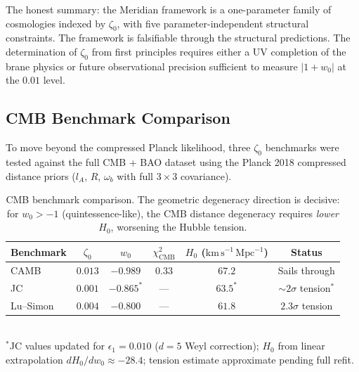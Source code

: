 The honest summary: the Meridian framework is a one-parameter family of cosmologies indexed by $\zeta_0$, with five parameter-independent structural constraints. The framework is falsifiable through the structural predictions. The determination of $\zeta_0$ from first principles requires either a UV completion of the brane physics or future observational precision sufficient to measure $|1+w_0|$ at the $0.01$ level.

\subsection{CMB Benchmark Comparison}
\label{sec:2-CMB-benchmarks}

To move beyond the compressed Planck likelihood, three $\zeta_0$ benchmarks were tested against the full CMB + BAO dataset using the Planck 2018 compressed distance priors ($l_A$, $R$, $\omega_b$ with full $3 \times 3$ covariance).

\begin{table}[htbp]
\centering
\caption{CMB benchmark comparison. The geometric degeneracy direction is decisive: for $w_0 > -1$ (quintessence-like), the CMB distance degeneracy requires \emph{lower} $H_0$, worsening the Hubble tension.}
\label{tab:2-CMB-benchmarks}
\begin{tabular}{lccccc}
\toprule
Benchmark & $\zeta_0$ & $w_0$ & $\chi^2_\mathrm{CMB}$ & $H_0$ ($\mathrm{km\,s^{-1}\,Mpc^{-1}}$) & Status \\
\midrule
CAMB    & $0.013$ & $-0.989$ & $0.33$ & $67.2$ & Sails through \\
JC      & $0.001$ & $-0.865^*$ & ---    & $63.5^*$ & ${\sim}2\sigma$ tension$^*$ \\
Lu--Simon & $0.004$ & $-0.800$ & ---  & $61.8$ & $2.3\sigma$ tension \\
\bottomrule
\end{tabular}\\[2pt]
{\footnotesize ${}^*$JC values updated for $\epsilon_1 = 0.010$ ($d = 5$ Weyl correction); $H_0$ from linear extrapolation $dH_0/dw_0 \approx -28.4$; tension estimate approximate pending full refit.}
\end{table}

